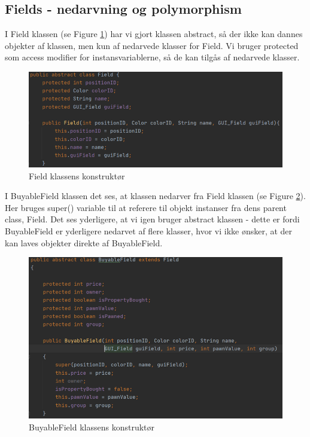 \begin{flushleft}
\subsection{Fields - nedarvning og polymorphism}
I Field klassen (se Figure \ref{Field_constructor}) har vi gjort klassen abstract, så der ikke kan dannes objekter af klassen, men kun af nedarvede klasser for Field. Vi bruger protected som access modifier for instansvariablerne, så de kan tilgås af nedarvede klasser.
\begin{figure}[H] %
    \centering
    \includegraphics[width=14cm]{Report/figures/Codesections/Field_constructor().png}
    \caption{Field klassens konstruktør}
    \label{Field_constructor}
\end{figure}

I BuyableField klassen det ses, at klassen nedarver fra Field klassen (se Figure \ref{BuyableField_constructor}). Her bruges super() variable til at referere til objekt instanser fra dens parent class, Field. Det ses yderligere, at vi igen bruger abstract klassen - dette er fordi BuyableField er yderligere nedarvet af flere klasser, hvor vi ikke ønsker, at der kan laves objekter direkte af BuyableField.
    
\begin{figure}[H]
    \centering
    \includegraphics[width=14cm]{Report/figures/Codesections/BuyableField_constructor().png}
    \caption{BuyableField klassens konstruktør}
    \label{BuyableField_constructor}
\end{figure}


\end{flushleft}
